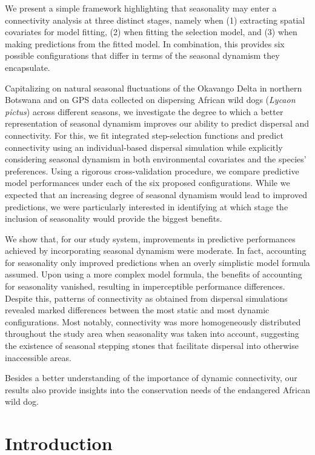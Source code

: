 \documentclass[../FinalThesis.tex]{subfiles}
\begin{document}
We present a simple framework highlighting that seasonality may enter a
connectivity analysis at three distinct stages, namely when (1) extracting
spatial covariates for model fitting, (2) when fitting the selection model, and
(3) when making predictions from the fitted model. In combination, this provides
six possible configurations that differ in terms of the seasonal dynamism they
encapsulate.

Capitalizing on natural seasonal fluctuations of the Okavango Delta in northern
Botswana and on GPS data collected on dispersing African wild dogs
(\textit{Lycaon pictus}) across different seasons, we investigate the degree to
which a better representation of seasonal dynamism improves our ability to
predict dispersal and connectivity. For this, we fit integrated step-selection
functions and predict connectivity using an individual-based dispersal
simulation while explicitly considering seasonal dynamism in both environmental
covariates and the species' preferences.  Using a rigorous cross-validation
procedure, we compare predictive model performances under each of the six
proposed configurations. While we expected that an increasing degree of seasonal
dynamism would lead to improved predictions, we were particularly interested in
identifying at which stage the inclusion of seasonality would provide the
biggest benefits.

We show that, for our study system, improvements in predictive performances
achieved by incorporating seasonal dynamism were moderate. In fact, accounting
for seasonality only improved predictions when an overly simplistic model
formula assumed. Upon using a more complex model formula, the benefits of
accounting for seasonality vanished, resulting in imperceptible performance
differences. Despite this, patterns of connectivity as obtained from dispersal
simulations revealed marked differences between the most static and most dynamic
configurations. Most notably, connectivity was more homogeneously distributed
throughout the study area when seasonality was taken into account, suggesting
the existence of seasonal stepping stones that facilitate dispersal into
otherwise inaccessible areas.

Besides a better understanding of the importance of dynamic connectivity, our
results also provide insights into the conservation needs of the endangered
African wild dog.

\newpage
\section{Introduction}
\end{document}
